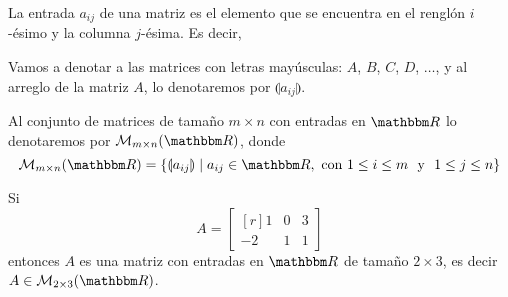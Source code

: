 \begin{observation}
    La entrada $a_{ij}$ de una matriz es el elemento que se encuentra en el renglón $i$-ésimo y la columna $j$-ésima. Es decir,
    \begin{center}
    \end{center}
\end{observation}

\begin{notation}
    Vamos a denotar a las matrices con letras mayúsculas: $A$, $B$, $C$, $D$, $\dots$, y al arreglo de la matriz $A$, lo denotaremos por $\llparenthesis a_{ij} \rrparenthesis$.
\end{notation}

\begin{notation}
    Al conjunto de matrices de tamaño $m \times n$ con entradas en $\RR$ lo denotaremos por $\matrizmn$, donde
    $$\matrizmn = \left\{ \llparenthesis a_{ij} \rrparenthesis \mid a_{ij} \in \RR, \text{ con } 1 \leq i \leq m \text{ ~y~ } 1 \leq j \leq n \right\}$$
\end{notation}

\begin{example}
    Si
    $$A = \begin{bmatrix*}[r]
        1 & 0 & 3 \\
        -2 & 1 & 1
    \end{bmatrix*}$$
    entonces $A$ es una matriz con entradas en $\RR$ de tamaño $2 \times 3$, es decir $A \in \mathcal{M}_{2 \times 3} (\RR)$.
\end{example}

